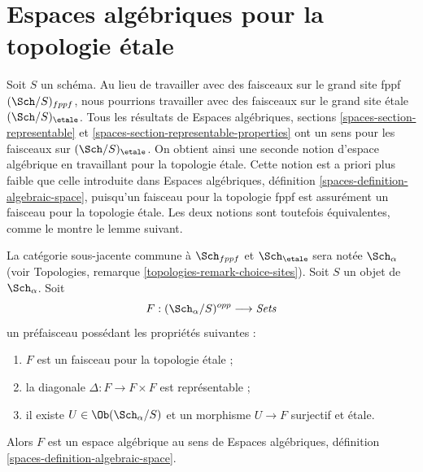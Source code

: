 \section{Espaces algébriques pour la topologie étale}
\label{section-spaces-etale}

\noindent
Soit $S$ un schéma. Au lieu de travailler avec des faisceaux sur
le grand site fppf $(\Sch/S)_{fppf}$, nous pourrions travailler avec des faisceaux
sur le grand site étale $(\Sch/S)_\etale$. Tous les résultats de
Espaces algébriques, sections \ref{spaces-section-representable} et
\ref{spaces-section-representable-properties}
ont un sens pour les faisceaux sur $(\Sch/S)_\etale$.
On obtient ainsi une seconde notion d'espace algébrique en travaillant pour la
topologie étale. Cette notion est a priori plus faible que celle introduite dans
Espaces algébriques, définition \ref{spaces-definition-algebraic-space},
puisqu'un faisceau pour la topologie fppf est assurément un faisceau pour la
topologie étale. Les deux notions sont toutefois équivalentes, comme le montre le
lemme suivant.

\begin{lemma}
\label{lemma-spaces-etale}
La catégorie sous-jacente commune à $\Sch_{fppf}$ et $\Sch_\etale$ sera notée
$\Sch_\alpha$
(voir Topologies, remarque \ref{topologies-remark-choice-sites}).
Soit $S$ un objet de $\Sch_\alpha$. Soit
$$
F : (\Sch_\alpha/S)^{opp} \longrightarrow \textit{Sets}
$$
un préfaisceau possédant les propriétés suivantes :
\begin{enumerate}
\item $F$ est un faisceau pour la topologie étale ;
\item la diagonale $\Delta : F \to F \times F$ est représentable ;
\item il existe $U \in \Ob(\Sch_\alpha/S)$
et un morphisme $U \to F$ surjectif et étale.
\end{enumerate}
Alors $F$ est un espace algébrique au sens de
Espaces algébriques, définition \ref{spaces-definition-algebraic-space}.
\end{lemma}

